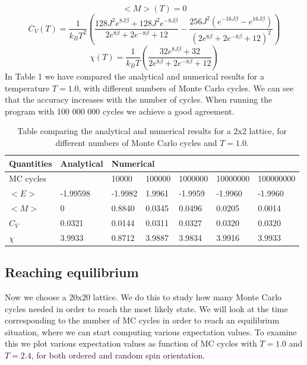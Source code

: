 \documentclass{article}
\begin{document}
$$<M>(T) = 0$$
$$C_V(T) = \frac{1}{k_B T^2}(\frac{128J^2e^{8J\beta}+128J^2e^{-8J\beta}}{ 2e^{8\beta} + 2e^{-8\beta} +12} - \frac{256J^2(e^{-16J\beta}-e^{16J\beta})}{ (2e^{8\beta} + 2e^{-8\beta} +12)^2}) $$
$$\chi (T)= \frac{1}{k_B T}(\frac{32e^{8J\beta}+32}{ 2e^{8\beta} + 2e^{-8\beta} +12 })$$
In Table 1 we have compared the analytical and numerical results for a temperature $T = 1.0$, with different numbers of Monte Carlo cycles. We can see that the accuracy increases with the number of cycles. When running the program with 100 000 000 cycles we achieve a good agreement. 
\begin{center}
\begin{table}
\centering
\label{my-label}
\begin{tabular}{|l|l|l|l|l|l|l|l|}
\hline
Quantities & \multicolumn{2}{l|}{Analytical} & \multicolumn{5}{l|}{Numerical}                    \\ \hline
MC cycles  & \multicolumn{2}{l|}{}           & 10000   & 100000 & 1000000 & 10000000 & 100000000 \\ \hline
$<E>$      & \multicolumn{2}{l|}{-1.99598}   & -1.9982 & 1.9961 & -1.9959 & -1.9960  & -1.9960   \\ \hline
$<M>$      & \multicolumn{2}{l|}{0}          & 0.8840  & 0.0345 & 0.0496  & 0.0205   & 0.0014    \\ \hline
$C_V$      & \multicolumn{2}{l|}{0.0321}     & 0.0144  & 0.0311 & 0.0327  & 0.0320   & 0.0320    \\ \hline
$\chi$     & \multicolumn{2}{l|}{3.9933}     & 0.8712  & 3.9887 & 3.9834  & 3.9916   & 3.9933    \\ \hline
\end{tabular}
\caption{Table comparing the analytical and numerical results for a 2x2 lattice, for different numbers of Monte Carlo cycles and $T = 1.0$.}
\end{table}
\end{center}

\subsection*{Reaching equilibrium}
Now we choose a 20x20 lattice. We do this to study how many Monte Carlo cycles needed in order to reach the most likely state. We will look at the time corresponding to the number of MC cycles in order to reach an equilibrium situation, where we can start computing various expectation values. To examine this we plot various expectation values as function of MC cycles with $T = 1.0$ and $T =2.4$, for both ordered and random spin orientation.\newline 
\end{document}

